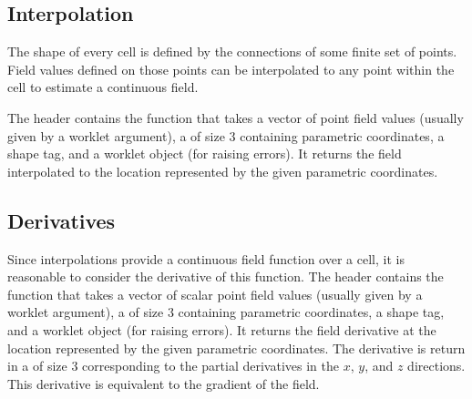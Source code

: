 
\subsection{Interpolation}


The shape of every cell is defined by the connections of some finite set of
points. Field values defined on those points can be interpolated to any
point within the cell to estimate a continuous field.

The  header contains the function
 that takes a vector of point field values
(usually given by a  worklet argument), a 
of size 3 containing parametric coordinates, a shape tag, and a worklet
object (for raising errors). It returns the field interpolated to the
location represented by the given parametric coordinates.



\subsection{Derivatives}


Since interpolations provide a continuous field function over a cell, it is
reasonable to consider the derivative of this function. The
 header contains the function
 that takes a vector of scalar point field values
(usually given by a  worklet argument), a 
of size 3 containing parametric coordinates, a shape tag, and a worklet
object (for raising errors). It returns the field derivative at the
location represented by the given parametric coordinates. The derivative is
return in a  of size 3 corresponding to the partial derivatives
in the $x$, $y$, and $z$ directions. This derivative is equivalent to the
gradient of the field.



